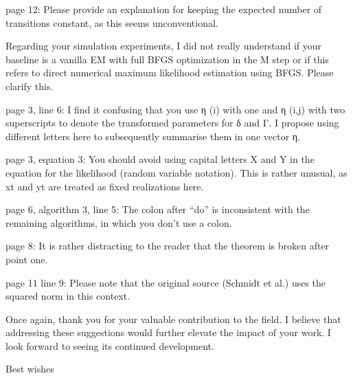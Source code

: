 \documentclass[11pt]{article}
\begin{document}
page 12: Please provide an explanation for keeping the expected number of transitions constant, as this seems unconventional.

Regarding your simulation experiments, I did not really understand if your baseline is a vanilla EM with full BFGS optimization in the M step or if this refers to direct numerical maximum likelihood estimation using BFGS. Please clarify this.

page 3, line 6: I find it confusing that you use η (i) with one and η (i,j) with two superscripts to denote the transformed parameters for δ and Γ. I propose using different letters here to subsequently summarise them in one vector η.

page 3, equation 3: You should avoid using capital letters X and Y in the equation for the likelihood (random variable notation). This is rather unusual, as xt and yt are treated as fixed realizations here.

page 6, algorithm 3, line 5: The colon after “do” is inconsistent with the remaining algorithms, in which you don’t use a colon.

page 8: It is rather distracting to the reader that the theorem is broken after point one.

page 11 line 9: Please note that the original source (Schmidt et al.) uses the squared norm in this context.

Once again, thank you for your valuable contribution to the field. I believe that addressing these suggestions would further elevate the impact of your work. I look forward to seeing its continued development.

Best wishes
\end{document}
